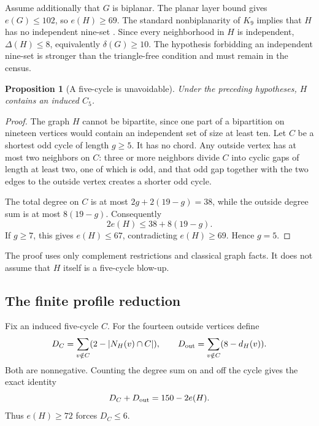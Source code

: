\documentclass[11pt,letterpaper]{article}
\newtheorem{proposition}[theorem]{Proposition}
\theoremstyle{definition}
\theoremstyle{remark}\newtheorem{remark}[theorem]{Remark}
\begin{document}
Assume additionally that $G$ is biplanar. The planar layer bound gives $e(G)\leq102$, so $e(H)\geq69$. The standard nonbiplanarity of $K_9$ implies that $H$ has no independent nine-set \cite{KSS}. Since every neighborhood in $H$ is independent, $\Delta(H)\leq8$, equivalently $\delta(G)\geq10$. The hypothesis forbidding an independent nine-set is stronger than the triangle-free condition and must remain in the census.

\begin{proposition}[A five-cycle is unavoidable]\label{prop:c5}
Under the preceding hypotheses, $H$ contains an induced $C_5$.
\end{proposition}
\begin{proof}
The graph $H$ cannot be bipartite, since one part of a bipartition on nineteen vertices would contain an independent set of size at least ten. Let $C$ be a shortest odd cycle of length $g\geq5$. It has no chord. Any outside vertex has at most two neighbors on $C$: three or more neighbors divide $C$ into cyclic gaps of length at least two, one of which is odd, and that odd gap together with the two edges to the outside vertex creates a shorter odd cycle.

The total degree on $C$ is at most $2g+2(19-g)=38$, while the outside degree sum is at most $8(19-g)$. Consequently
\[
2e(H)\leq38+8(19-g).
\]
If $g\geq7$, this gives $e(H)\leq67$, contradicting $e(H)\geq69$. Hence $g=5$.
\end{proof}
The proof uses only complement restrictions and classical graph facts. It does not assume that $H$ itself is a five-cycle blow-up.

\subsection{The finite profile reduction}
Fix an induced five-cycle $C$. For the fourteen outside vertices define
\[
D_C=\sum_{v\notin C}(2-|N_H(v)\cap C|),\qquad
D_{\rm out}=\sum_{v\notin C}(8-d_H(v)).
\]
Both are nonnegative. Counting the degree sum on and off the cycle gives the exact identity
\begin{equation}\label{eq:deficits}
D_C+D_{\rm out}=150-2e(H).
\end{equation}
Thus $e(H)\geq72$ forces $D_C\leq6$.
\end{document}
